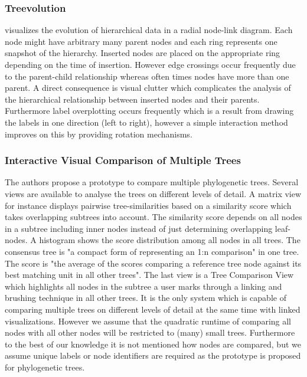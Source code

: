 \subsubsection{Treevolution\cite{theron2006hierarchical}} visualizes the evolution of hierarchical data in a radial node-link diagram. Each node might have arbitrary many parent nodes and each ring represents one snapshot of the hierarchy. Inserted nodes are placed on the appropriate ring depending on the time of insertion. However edge crossings occur frequently due to the parent-child relationship whereas often times nodes have more than one parent. A direct consequence is visual clutter which complicates the analysis of the hierarchical relationship between inserted nodes and their parents. Furthermore label overplotting occurs frequently which is a result from drawing the labels in one direction (left to right), however a simple interaction method improves on this by providing rotation mechanisms.

\subsubsection{Interactive Visual Comparison of Multiple Trees\cite{bremm2011interactive}} The authors propose a prototype to compare multiple phylogenetic trees. Several views are available to analyse the trees on different levels of detail. A matrix view for instance displays pairwise tree-similarities based on a similarity score which takes overlapping subtrees into account. The similarity score depends on all nodes in a subtree including inner nodes instead of just determining overlapping leaf-nodes. A histogram shows the score distribution among all nodes in all trees. The consensus tree is "a compact form of representing an 1:n comparison" in one tree. The score is "the average of the scores comparing a reference tree node against its best matching unit in all other trees". The last view is a Tree Comparison View which highlights all nodes in the subtree a user marks through a linking and brushing technique in all other trees. It is the only system which is capable of comparing multiple trees on different levels of detail at the same time with linked visualizations. However we assume that the quadratic runtime of comparing all nodes with all other nodes will be restricted to (many) small trees. Furthermore to the best of our knowledge it is not mentioned how nodes are compared, but we assume unique labels or node identifiers are required as the prototype is proposed for phylogenetic trees. 

